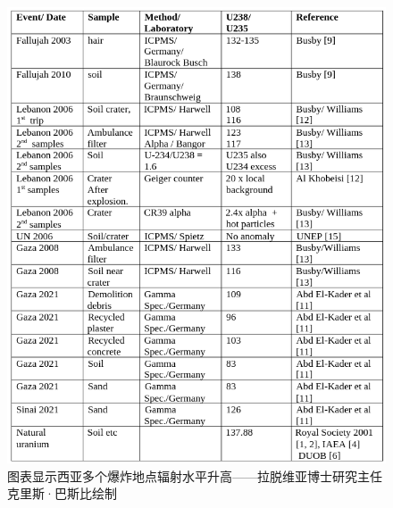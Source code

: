 \documentclass[10pt,twocolumn,letterpaper]{article}
\begin{document}
\begin{figure}[t]
\begin{center}
\includegraphics[width=1\textwidth]{nukes.png}
\end{center}
   \caption{图表显示西亚多个爆炸地点辐射水平升高——拉脱维亚博士研究主任克里斯·巴斯比绘制 \cite{32,33}}
   \label{fig:14}
\end{figure}
\end{document}
